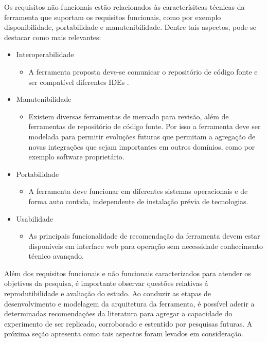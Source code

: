 \documentclass[12pt,openany,oneside,a4paper,english,brazil]{abntbibufjf}
\begin{document}
		Os requisitos não funcionais estão relacionados às caracterísitcas técnicas da ferramenta que suportam os requisitos funcionais, como por exemplo disponibilidade, portabilidade e manutenibilidade. Dentre tais aspectos, pode-se destacar como mais relevantes:
	\begin{itemize}
		\item Interoperabilidade
		\begin{itemize}
			\item A ferramenta proposta deve-se comunicar o repositório de código fonte e ser compatível diferentes IDEs .
		\end{itemize}
		\item Manutenibilidade
		\begin{itemize}
			\item Existem diversas ferramentas de mercado para revisão, além de ferramentas de repositório de código fonte. Por isso a ferramenta deve ser modelada para permitir evoluções futuras que permitam a agregação de novas integrações que sejam importantes em outros domínios, como por exemplo software proprietário.
		\end{itemize}
    \item Portabilidade
    \begin{itemize}
      \item A ferramenta deve funcionar em diferentes sistemas operacionais e de forma auto contida, independente de instalação prévia de tecnologias.
    \end{itemize}
    \item Usabilidade
    \begin{itemize}
      \item As principais funcionalidade de recomendação da ferramenta devem estar disponíveis em interface web para operação sem necessidade conhecimento técnico avançado.
    \end{itemize}
	\end{itemize}


    Além dos requisitos funcionais e não funcionais caracterizados para atender os objetivos da pesquisa, é importante observar questões relativas á reprodutibilidade e avaliação do estudo. Ao conduzir as etapas de desenvolvimento e modelagem da arquitetura da ferramenta, é possível aderir a determinadas recomendações da literatura para agregar a capacidade do experimento de ser replicado, corroborado e estentido por pesquisas futuras. A próxima seção apresenta como tais aspectos foram levados em consideração.
\end{document}
